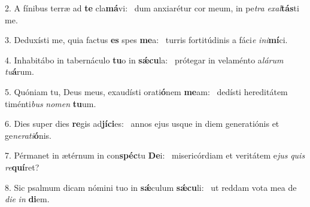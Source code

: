 2. A fínibus terræ ad \textbf{te} cla\textbf{má}vi: \ast\  dum anxiarétur cor meum, in pe\textit{tra} \textit{ex}\textit{al}\textbf{tás}ti me.\

3. Deduxísti me, quia factus \textbf{es} spes \textbf{me}a: \ast\  turris fortitúdinis a fáci\textit{e} \textit{in}\textit{i}\textbf{mí}ci.\

4. Inhabitábo in tabernáculo \textbf{tu}o in \textbf{sǽ}\textbf{cu}la: \ast\  prótegar in velaménto a\textit{lá}\textit{rum} \textit{tu}\textbf{á}rum.\

5. Quóniam tu, Deus meus, exaudísti orati\textbf{ó}nem \textbf{me}am: \ast\  dedísti hereditátem timénti\textit{bus} \textit{no}\textit{men} \textbf{tu}um.\

6. Dies super dies \textbf{re}gis ad\textbf{jí}\textbf{ci}es: \ast\  annos ejus usque in diem generatiónis et ge\textit{ne}\textit{ra}\textit{ti}\textbf{ó}nis.\

7. Pérmanet in ætérnum in con\textbf{spéc}tu \textbf{De}i: \ast\  misericórdiam et veritátem e\textit{jus} \textit{quis} \textit{re}\textbf{quí}ret?\

8. Sic psalmum dicam nómini tuo in \textbf{sǽ}culum \textbf{sǽ}\textbf{cu}li: \ast\  ut reddam vota mea de \textit{di}\textit{e} \textit{in} \textbf{di}em.\

